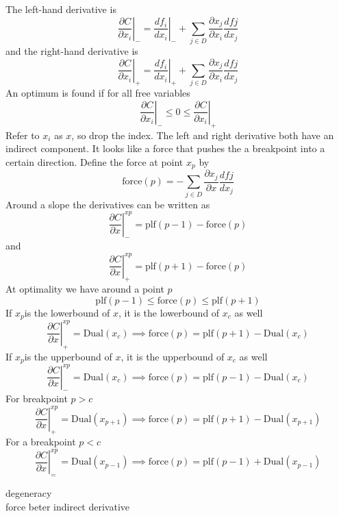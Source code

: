 \documentclass[]{article}
\newcommand{\plf}[0]{\text{plf}}
\newcommand{\force}[0]{\text{force}}
\newcommand{\Dual}[0]{\text{Dual}}
\begin{document}
The left-hand derivative is
\[
   \left. \frac{\partial C} {\partial x_i} \right|_- =
   \left. \frac{d f_i} {d x_i} \right|_-
   + \sum_{j \in D} \frac{\partial x_j }{\partial x_i} \frac{d f{j}} {d x_j}
\]
and the right-hand derivative is
\[
   \left. \frac{\partial C} {\partial x_i} \right|_+ =
   \left. \frac{d f_i} {d x_i} \right|_+
   + \sum_{j \in D} \frac{\partial x_j }{\partial x_i} \frac{d f{j}} {d x_j}
\]
An optimum is found if for all free variables
\[
   \left. \frac{\partial C} {\partial x_i} \right|_- \le 0 \le
   \left. \frac{\partial C} {\partial x_i} \right|_+
\]
Refer to $x_i$ as $x$, so drop the index.
The left and right derivative both have an indirect component.
It looks like a force that pushes the a breakpoint into a certain direction.
Define the force at point $x_p$ by
\[ \force(p) = - \sum_{j \in D} \frac{\partial x_j }{\partial x} \frac{d f{j}} {d x_j} \]
Around a slope the derivatives can be written as
\[
   \left. \frac{\partial C} {\partial x} \right|^{xp}_- = \plf(p-1) - \force(p)
\]
and
\[
   \left. \frac{\partial C} {\partial x} \right|^{xp}_+ =  \plf(p+1) - \force(p)
\]
At optimality we have around a point $p$
\[ \plf(p-1) \le \force(p) \le \plf(p+1) \]
If $x_p$is the lowerbound of $x$, it is the lowerbound of $x_c$ as well
\[
   \left. \frac{\partial C} {\partial x} \right|^{xp}_+ = \Dual(x_c)
      \implies \force(p) = \plf(p+1) -  \Dual(x_c)
\]
If $x_p$is the upperbound of $x$, it is the upperbound of $x_c$ as well
\[
   \left. \frac{\partial C} {\partial x} \right|^{xp}_- = \Dual(x_c)
      \implies \force(p) = \plf(p-1) -  \Dual(x_c)
\]
For breakpoint $p>c$
\[
   \left. \frac{\partial C} {\partial x} \right|^{xp}_+ = \Dual(x_{p+1})
      \implies \force(p) = \plf(p+1) -  \Dual(x_{p+1})
\]
For a breakpoint $p<c$
\[
   \left. \frac{\partial C} {\partial x} \right|^{xp}_= = \Dual(x_{p-1})
      \implies \force(p) = \plf(p-1) +  \Dual(x_{p-1})
\]

degeneracy\\
force beter indirect derivative\\
\end{document}
